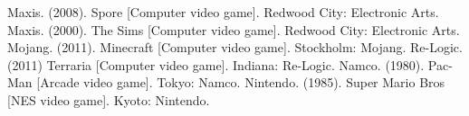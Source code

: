 \documentclass[a4paper,11pt]{article}
\begin{document}
\begin{thebibliography}{99}
        Maxis. (2008). Spore [Computer video game]. Redwood City: Electronic Arts.
        Maxis. (2000). The Sims [Computer video game]. Redwood City: Electronic Arts.
        Mojang. (2011). Minecraft [Computer video game]. Stockholm:	Mojang.
        Re-Logic. (2011) Terraria [Computer video game]. Indiana: Re-Logic.
        Namco. (1980). Pac-Man [Arcade video game]. Tokyo: Namco.
        Nintendo. (1985). Super Mario Bros [NES video game]. Kyoto: Nintendo.
      \end{thebibliography}

  
\end{document}
